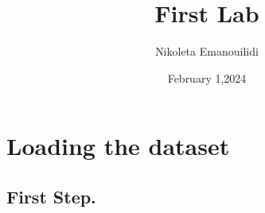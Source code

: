 \documentclass[
]{article}
\title{First Lab}
\author{Nikoleta Emanouilidi}
\date{February 1,2024}
\begin{document}
\maketitle

\hypertarget{loading-the-dataset}{%
\section{\texorpdfstring{\textbf{Loading the
dataset}}{Loading the dataset}}\label{loading-the-dataset}}

\hypertarget{first-step.}{%
\subsection{First Step.}\label{first-step.}}

\hypertarget{we-load-the-dataset-and-read-the-.csv-file.the-fivethirtyeight-article-you-cant-trust-what-you-read-about-nutrition-delves-into-the-challenges-of-obtaining-reliable-nutritional-information.-it-discusses-how-various-entities-offer-conflicting-dietary-advice-based-on-different-perspectives-resulting-in-a-lack-of-consensus-on-what-constitutes-a-healthy-diet.the-full-article-is-avalaible-here-httpsfivethirtyeight.comfeaturesyou-cant-trust-what-you-read-about-nutrition.-the-original-data-file-is-available-here-httpsgithub.comnikoletaem607labsblobee8e0eb2fb25b36a28daa4684d3685a02982cd29raw_anonymized_data.csv}{%
}
\end{document}
